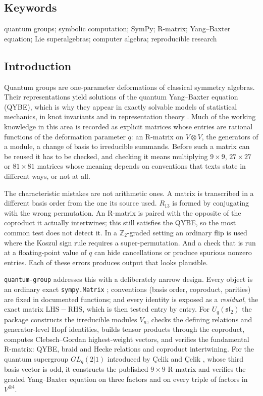 \documentclass[11pt,a4paper]{article}
\newcommand{\pkg}{\texttt{quantum-group}}
\newcommand{\code}[1]{\texttt{#1}}
\newcommand{\Uq}{U_q(\mathfrak{sl}_2)}
\newcommand{\GL}{GL_q(2|1)}
\begin{document}
\subsection*{Keywords}

quantum groups; symbolic computation; SymPy; R-matrix; Yang--Baxter equation; Lie superalgebras; computer algebra; reproducible research

\subsection*{Introduction}

Quantum groups are one-parameter deformations of classical symmetry algebras. Their representations yield solutions of the quantum Yang--Baxter equation (QYBE), which is why they appear in exactly solvable models of statistical mechanics, in knot invariants and in representation theory \cite{drinfeld1987,jimbo1985,jimbo1986,kassel1995}. Much of the working knowledge in this area is recorded as explicit matrices whose entries are rational functions of the deformation parameter $q$: an R-matrix on $V\otimes V$, the generators of a module, a change of basis to irreducible summands. Before such a matrix can be reused it has to be checked, and checking it means multiplying $9\times9$, $27\times27$ or $81\times81$ matrices whose meaning depends on conventions that texts state in different ways, or not at all.

The characteristic mistakes are not arithmetic ones. A matrix is transcribed in a different basis order from the one its source used. $R_{13}$ is formed by conjugating with the wrong permutation. An R-matrix is paired with the opposite of the coproduct it actually intertwines; this still satisfies the QYBE, so the most common test does not detect it. In a $\mathbb{Z}_2$-graded setting an ordinary flip is used where the Koszul sign rule requires a super-permutation. And a check that is run at a floating-point value of $q$ can hide cancellations or produce spurious nonzero entries. Each of these errors produces output that looks plausible.

\pkg{} addresses this with a deliberately narrow design. Every object is an ordinary exact \code{sympy.Matrix} \cite{meurer2017sympy}; conventions (basis order, coproduct, parities) are fixed in documented functions; and every identity is exposed as a \emph{residual}, the exact matrix $\mathrm{LHS}-\mathrm{RHS}$, which is then tested entry by entry. For $\Uq$ the package constructs the irreducible modules $V_n$, checks the defining relations and generator-level Hopf identities, builds tensor products through the coproduct, computes Clebsch--Gordan highest-weight vectors, and verifies the fundamental R-matrix: QYBE, braid and Hecke relations and coproduct intertwining. For the quantum supergroup $\GL$ introduced by Çelik and Çelik \cite{celik2021}, whose third basis vector is odd, it constructs the published $9\times9$ R-matrix and verifies the graded Yang--Baxter equation on three factors and on every triple of factors in $V^{\otimes4}$.
\end{document}
